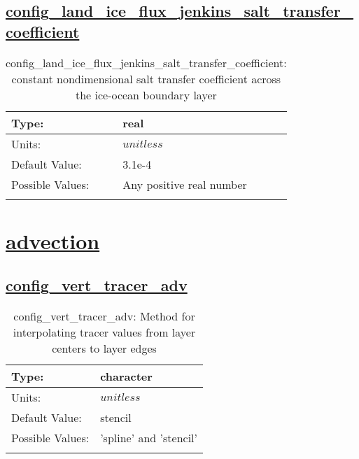\subsection[config\_land\_ice\_flux\_jenkins\_salt\_transfer\_coefficient]{\hyperref[sec:nm_tab_land_ice_fluxes]{config\_land\_ice\_flux\_jenkins\_salt\_transfer\_coefficient}}
\label{subsec:nm_sec_config_land_ice_flux_jenkins_salt_transfer_coefficient}
\begin{center}
\begin{longtable}{| p{2.0in} || p{4.0in} |}
    \hline
    Type: & real \\
    \hline
    Units: & $unitless$ \\
    \hline
    Default Value: & 3.1e-4 \\
    \hline
    Possible Values: & Any positive real number \\
    \hline
    \caption{config\_land\_ice\_flux\_jenkins\_salt\_transfer\_coefficient: constant nondimensional salt transfer coefficient across the ice-ocean boundary layer}
\end{longtable}
\end{center}
\section[advection]{\hyperref[sec:nm_tab_advection]{advection}}
\label{sec:nm_sec_advection}
\subsection[config\_vert\_tracer\_adv]{\hyperref[sec:nm_tab_advection]{config\_vert\_tracer\_adv}}
\label{subsec:nm_sec_config_vert_tracer_adv}
\begin{center}
\begin{longtable}{| p{2.0in} || p{4.0in} |}
    \hline
    Type: & character \\
    \hline
    Units: & $unitless$ \\
    \hline
    Default Value: & stencil \\
    \hline
    Possible Values: & 'spline' and 'stencil' \\
    \hline
    \caption{config\_vert\_tracer\_adv: Method for interpolating tracer values from layer centers to layer edges}
\end{longtable}
\end{center}

